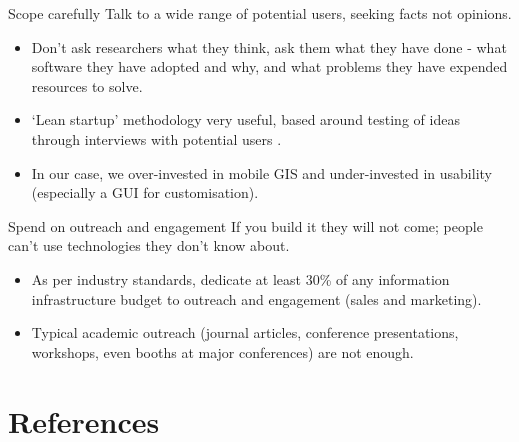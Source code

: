 \documentclass[aspectratio=169, 11pt]{beamer} %
\begin{document}
\begin{frame}{Scope carefully}
  Talk to a wide range of potential users, seeking facts not opinions.
      \begin{itemize}[label=\textbullet]
        \item Don’t ask researchers what they think, ask them what they have done - what software they have adopted and why, and what problems they have expended resources to solve. 
        \item ‘Lean startup’ methodology very useful, based around  testing of ideas through interviews with potential users \cite{Strategyzer_AG2019-uu}.
        \item In our case, we over-invested in mobile GIS and under-invested in usability (especially a GUI for customisation).
    \end{itemize}
\end{frame}

\begin{frame}{Spend on outreach and engagement}
  If you build it they will not come; people can't use technologies they don't know about.
      \begin{itemize}[label=\textbullet]
        \item As per industry standards, dedicate at least 30\% of any information infrastructure budget to outreach and engagement (sales and marketing). 
        \item Typical academic outreach (journal articles, conference presentations, workshops, even booths at major conferences) are not enough.
    \end{itemize}
\end{frame}

% 


\section{References}

\begin{multicols}{2}[]


\end{multicols}


  
%   
%   
\end{document}

